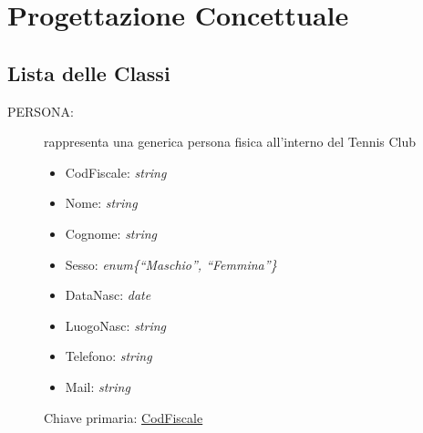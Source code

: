 \chapter{Progettazione Concettuale} 

\section{Lista delle Classi}
\begin{description}
\item[PERSONA:] rappresenta una generica persona fisica all’interno del Tennis Club
\begin{itemize}
\item CodFiscale: \textit{string} \hfill 
\item Nome: \textit{string}  \hfill 
\item Cognome: \textit{string}  \hfill 
\item Sesso: \textit{enum\{“Maschio”, “Femmina”\}}  \hfill 
\item DataNasc: \textit{date}  \hfill 
\item LuogoNasc: \textit{string}  \hfill 
\item Telefono: \textit{string}  \hfill 
\item Mail: \textit{string}  \hfill 
\end{itemize}
Chiave primaria: \underline{CodFiscale} \hfill \\


\end{description}

